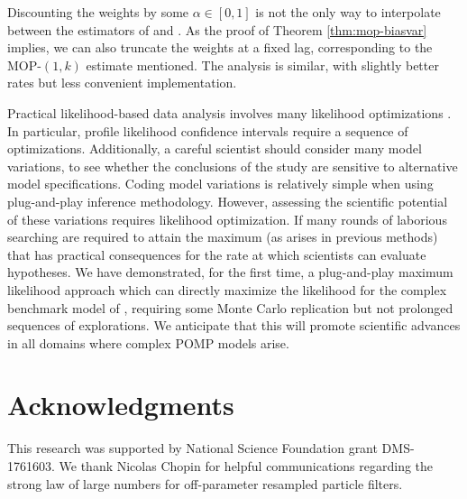 \documentclass[11pt]{article}
\newcommand\arxiv[2]{#1} %
\begin{document}
Discounting the weights by some $\alpha \in [0,1]$ is not the only way to interpolate between the estimators of \cite{naesseth18} and \cite{poyiadjis11}. 
As the proof of Theorem \ref{thm:mop-biasvar} implies, we can also truncate the weights at a fixed lag, corresponding to the MOP-$(1,k)$ estimate mentioned. 
The analysis is similar, with slightly better rates but less convenient implementation. 

Practical likelihood-based data analysis involves many likelihood optimizations \cite{king08,blake14,pons-salort18,subramanian21,fox22,drake23}.
In particular, profile likelihood confidence intervals require a sequence of optimizations.
Additionally, a careful scientist should consider many model variations, to see whether the conclusions of the study are sensitive to alternative model specifications.
Coding model variations is relatively simple when using plug-and-play inference methodology.
However, assessing the scientific potential of these variations requires likelihood optimization.
If many rounds of laborious searching are required to attain the maximum (as arises in previous methods) that has practical consequences for the rate at which scientists can evaluate hypotheses.
We have demonstrated, for the first time, a plug-and-play maximum likelihood approach which can directly maximize the likelihood for the complex benchmark model of \cite{king08}, requiring some Monte Carlo replication but not prolonged sequences of explorations.
We anticipate that this will promote scientific advances in all domains where complex POMP models arise.



\arxiv{
\section*{Acknowledgments}
This research was supported by National Science Foundation grant DMS-1761603. 
We thank Nicolas Chopin for helpful communications regarding the strong law of large numbers for off-parameter resampled particle filters. 
}{
\showmatmethods{} %
\acknow{Please include your acknowledgments here, set in a single paragraph. Please do not include any acknowledgments in the Supporting Information, or anywhere else in the manuscript.}
\showacknow{} %
}

\end{document}
